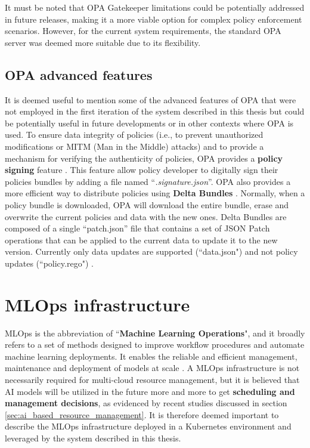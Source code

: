 It must be noted that OPA Gatekeeper limitations could be potentially addressed in future releases, making it a more viable option for complex policy enforcement scenarios. 
However, for the current system requirements, the standard OPA server was deemed more suitable due to its flexibility.

\subsection{OPA advanced features}

It is deemed useful to mention some of the advanced features of OPA that were not employed in the first iteration of the system described in this thesis but could be potentially useful in future developments or in other contexts where OPA is used.
\newline
To ensure data integrity of policies (i.e., to prevent unauthorized modifications or MITM (Man in the Middle) attacks) and to provide a mechanism for verifying the authenticity of policies, OPA provides a \textbf{policy signing} feature \cite{opa_signing}.
This feature allow policy developer to digitally sign their policies bundles by adding a file named ``\textit{.signature.json}''.
\newline
OPA also provides a more efficient way to distribute policies using \textbf{Delta Bundles} \cite{opa_delta_bundles}.
Normally, when a policy bundle is downloaded, OPA will download the entire bundle, erase and overwrite the current policies and data with the new ones.
Delta Bundles are composed of a single ``patch.json'' file that contains a set of JSON Patch operations that can be applied to the current data to update it to the new version. Currently only data updates are supported (``data.json") and not policy updates (``policy.rego") \cite{opa_delta_bundles}.

\newpage

\section{MLOps infrastructure}

MLOps is the abbreviation of ``\textbf{Machine Learning Operations}", and it broadly refers to a set of methods designed to improve workflow procedures and automate machine learning deployments. 
It enables the reliable and efficient management, maintenance and deployment of models at scale \cite{mlops_ubuntu}.
A MLOps infrastructure is not necessarily required for multi-cloud resource management, but it is believed that AI models will be utilized in the future more and more to get \textbf{scheduling and management decisions}, as evidenced by recent studies discussed in section \ref{sec:ai_based_resource_management}.
It is therefore deemed important to describe the MLOps infrastructure deployed in a Kubernetes environment and leveraged by the system described in this thesis.

